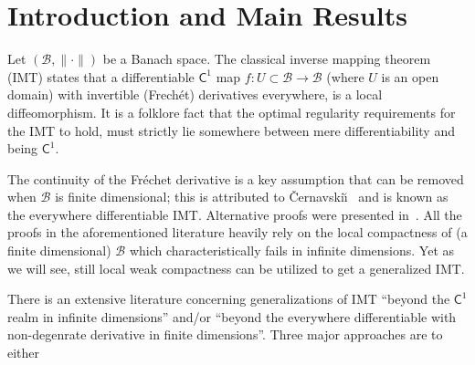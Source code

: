\documentclass[a4, 12pt,leqno]{amsart}
\theoremstyle{plain}
\theoremstyle{definition}
\theoremstyle{remark}
\numberwithin{equation}{section}
\newcommand{\B}{\mathcal{B}}
\begin{document}
\section{Introduction and Main Results}
\par Let $\left(\B, \|\cdot\|\right)$ be a Banach space. The classical inverse mapping theorem (IMT) states that a differentiable $\mathsf{C}^1$ map $f:U\subset \B \to \B$ (where $U$ is an open domain) with invertible (Frech\'et) derivatives everywhere, is a local diffeomorphism. It is a folklore fact that the optimal regularity requirements for the IMT to hold, must strictly lie somewhere between mere differentiability and being $\mathsf{C}^1$. 
\par The continuity of the Fr\'echet derivative is a key assumption that can be removed when $\B$ is finite dimensional; this is attributed to \v{C}ernavski\u{\i}~\cite{Cer} and is known as the everywhere differentiable IMT. Alternative proofs were presented in~\cite{JSR, Vais}. All the proofs in the aforementioned literature heavily rely on the local compactness of (a finite dimensional) $\B$ which characteristically fails in infinite dimensions. Yet as we will see, still local weak compactness can be utilized to get a generalized IMT.
\par There is an extensive literature concerning generalizations of IMT ``beyond the  $\mathsf{C}^1$ realm in infinite dimensions'' and/or ``beyond the everywhere differentiable with non-degenrate derivative in finite dimensions''. Three major approaches are to either
\end{document}
